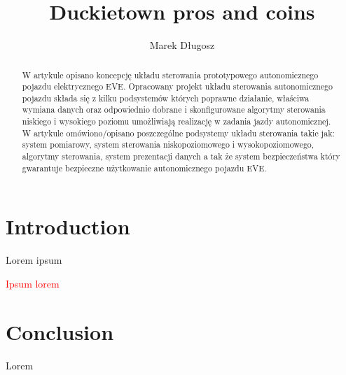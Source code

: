 \documentclass{svproc}
\begin{document}
\mainmatter              %
%
\title{Duckietown pros and coins}
%
%
\author{Marek Długosz}
%
%
%

\maketitle              %

\begin{abstract}
W artykule opisano koncepcję układu sterowania prototypowego autonomicznego pojazdu elektrycznego EVE. Opracowany projekt układu sterowania autonomicznego pojazdu składa się z kilku podsystemów których poprawne działanie, właściwa wymiana danych oraz odpowiednio dobrane i skonfigurowane algorytmy sterowania niskiego i wysokiego poziomu umożliwiają realizację w zadania jazdy autonomicznej. W artykule omówiono/opisano poszczególne podsystemy układu sterowania takie jak: system pomiarowy, system sterowania niskopoziomowego i wysokopoziomowego, algorytmy sterowania, system prezentacji danych a tak że system bezpieczeństwa który gwarantuje bezpieczne użytkowanie autonomicznego pojazdu EVE.
\end{abstract}
%
\section{Introduction}
Lorem ipsum

%
\textcolor{red}{
Ipsum lorem}

\section{Conclusion}
Lorem



\end{document}
